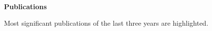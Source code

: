 \documentclass[12pt]{article}
\makeatletter
\newcommand{\Strasse}{Burg 4}
\newcommand{\Ort}{Braunschweig}
\newcommand{\Plz}{38124}
\newcommand{\Telefon}{+49~5341~4022052}
\newcommand{\Email}{stephan.sigg@udo.edu}
\newcommand{\Country}{Germany}
\makeatother
\begin{document}
\centerline{ \Large \textbf{Publications}}
 \vspace{1cm}
Most significant publications of the last three years are highlighted.
\end{document}
